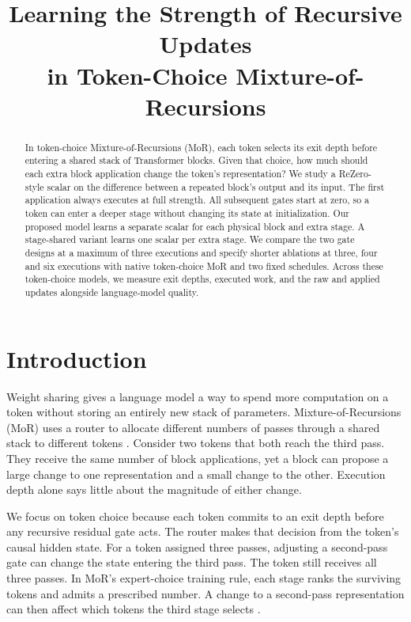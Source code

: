 \documentclass[11pt,letterpaper]{article}
\title{\bfseries Learning the Strength of Recursive Updates\\in Token-Choice Mixture-of-Recursions}
\author{\paperauthors}
\date{}
\begin{document}
\maketitle
\begin{abstract}
In token-choice Mixture-of-Recursions (MoR), each token selects its exit depth before entering a shared stack of Transformer blocks. Given that choice, how much should each extra block application change the token's representation? We study a ReZero-style scalar on the difference between a repeated block's output and its input. The first application always executes at full strength. All subsequent gates start at zero, so a token can enter a deeper stage without changing its state at initialization. Our proposed model learns a separate scalar for each physical block and extra stage. A stage-shared variant learns one scalar per extra stage. We compare the two gate designs at a maximum of three executions and specify shorter ablations at three, four and six executions with native token-choice MoR and two fixed schedules. Across these token-choice models, we measure exit depths, executed work, and the raw and applied updates alongside language-model quality.
\end{abstract}

\section{Introduction}
Weight sharing gives a language model a way to spend more computation on a token without storing an entirely new stack of parameters. Mixture-of-Recursions (MoR) uses a router to allocate different numbers of passes through a shared stack to different tokens \citep{bae2025mor}. Consider two tokens that both reach the third pass. They receive the same number of block applications, yet a block can propose a large change to one representation and a small change to the other. Execution depth alone says little about the magnitude of either change.

We focus on token choice because each token commits to an exit depth before any recursive residual gate acts. The router makes that decision from the token's causal hidden state. For a token assigned three passes, adjusting a second-pass gate can change the state entering the third pass. The token still receives all three passes. In MoR's expert-choice training rule, each stage ranks the surviving tokens and admits a prescribed number. A change to a second-pass representation can then affect which tokens the third stage selects \citep[Sec.~2.2.1]{bae2025mor}.
\end{document}
